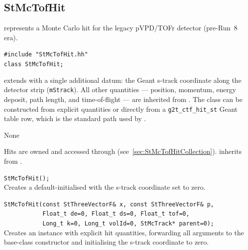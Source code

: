 %
%
\subsection{StMcTofHit}
 
\label{sec:StMcTofHit}
\begin{Entry}
\item[Summary]
     represents a Monte Carlo hit for the legacy
    pVPD/TOFr detector (pre-Run~8 era).

\item[Synopsis]
    \verb+#include "StMcTofHit.hh"+\\
    \verb+class StMcTofHit;+\\

\item[Description]
     extends  with a single
    additional datum: the Geant s-track coordinate along the
    detector strip (\texttt{mStrack}).  All other quantities ---
    position, momentum, energy deposit, path length, and
    time-of-flight --- are inherited from .
    The class can be constructed from explicit quantities or
    directly from a \texttt{g2t\_ctf\_hit\_st} Geant table row,
    which is the standard path used by .

\item[Persistence]
    None

\item[Related Classes]
    Hits are owned and accessed through
     (see~\ref{sec:StMcTofHitCollection}).
     inherits from .

\item[Public\\ Constructors]
    \verb+StMcTofHit();+\\
    Creates a default-initialised  with the
    s-track coordinate set to zero.

    \verb+StMcTofHit(const StThreeVectorF& x, const StThreeVectorF& p,+\\
    \verb+           Float_t de=0, Float_t ds=0, Float_t tof=0,+\\
    \verb+           Long_t k=0, Long_t volId=0, StMcTrack* parent=0);+\\
    Creates an instance with explicit hit quantities, forwarding
    all arguments to the  base-class constructor and
    initialising the s-track coordinate to zero.


\end{Entry}
